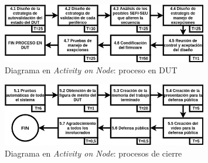 \documentclass[
11pt, %
]{charter}
\begin{document}
\begin{figure}[htpb]
	\centering 
	\includegraphics[width=0.8\textwidth]{./Figuras/AoN4.png}
	\caption{Diagrama en \textit{Activity on Node}: proceso en DUT}
	\label{fig:AoN4}
\end{figure}

\begin{figure}[htpb]
	\centering 
	\includegraphics[width=0.8\textwidth]{./Figuras/AoN5.png}
	\caption{Diagrama en \textit{Activity on Node}: procesos de cierre}
	\label{fig:AoN5}
\end{figure}
\end{document}
